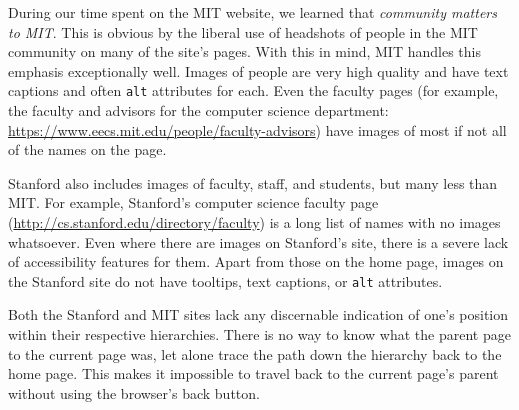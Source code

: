 During our time spent on the MIT website, we learned that \textit{community
matters to MIT}. This is obvious by the liberal use of headshots of people in
the MIT community on many of the site's pages. With this in mind, MIT handles
this emphasis exceptionally well. Images of people are very high quality and
have text captions and often \texttt{alt} attributes for each. Even the faculty
pages (for example, the faculty and advisors for the computer science department:
\url{https://www.eecs.mit.edu/people/faculty-advisors}) have images of most if
not all of the names on the page.

Stanford also includes images of faculty, staff, and students, but many less
than MIT. For example, Stanford's computer science faculty page
(\url{http://cs.stanford.edu/directory/faculty}) is a long list of names
with no images whatsoever. Even where there are images on Stanford's site,
there is a severe lack of accessibility features for them. Apart from those
on the home page, images on the Stanford site do not have tooltips, text
captions, or \texttt{alt} attributes.

Both the Stanford and MIT sites lack any discernable indication of one's position within their respective hierarchies.
There is no way to know what the parent page to the current page was, let alone trace the path down the hierarchy back to
the home page. This makes it impossible to travel back to the current page's parent without using the browser's back
button.